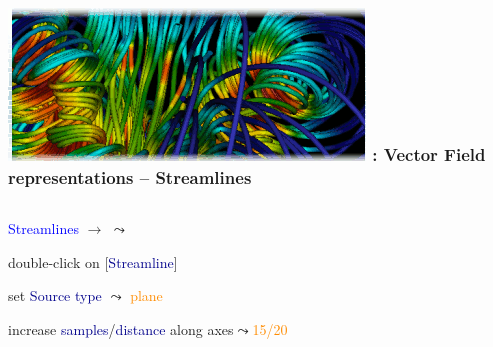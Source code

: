 \begin{frame}
\frametitle{\href{https://wci.llnl.gov/simulation/computer-codes/visit/}{\includegraphics[height=.85cm]{figs/visit-logos/VisIt-01}} \hspace{-.85cm}{\bf \textcolor{lightgray}{VisIt}}: Vector Field representations -- {Streamlines}}
\begin{columns}
\begin{column}{9cm}
\begin{beamerboxesrounded}[upper=block head,lower=block body,shadow=true]{\textcolor{DarkRed}{} \textcolor{blue}{Streamlines}}
	\textcolor{DarkBlue}{} 
			$\rightarrow$ \framebox{\bf \textcolor{DarkBlue}{Streamline}}
			$\leadsto$ \framebox{\textcolor{DarkGreen}{grad}}

	\vspace{2mm}
	\textcolor{DarkBlue}{} 
		double-click on [\textcolor{DarkBlue}{Streamline}]

	\vspace{.75mm}
	\hspace{3.5mm}
		set \textcolor{DarkBlue}{Source type} $\leadsto$ \textcolor{DarkOrange}{plane}

	\hspace{3.5mm}
		increase \textcolor{DarkBlue}{samples}/\textcolor{DarkBlue}{distance} along axes$\leadsto$\textcolor{DarkOrange}{15/20}


\end{beamerboxesrounded}
\end{column}
\end{columns}
\end{frame}
